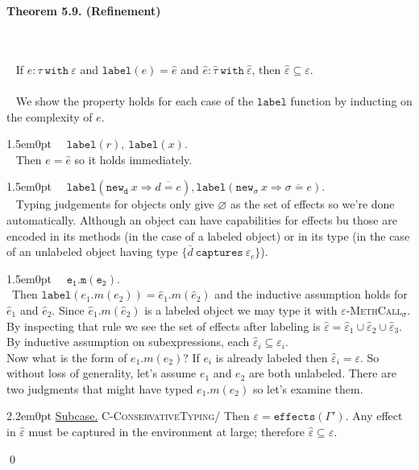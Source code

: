 \documentclass{llncs}
\newcommand{\keywadj}[1]{\mathtt{#1}}
\newcommand{\keyw}[1]{\keywadj{#1}~}
\newcommand{\thm}[3]{
	\begin{large}
		\bf{#1}
	\end{large} \\\\
	\fbox{Statement.} ~ #2
	\fbox{Proof.}~ #3 \qed
}
\newcommand{\proofcase}[2]{
	\begin{adjustwidth}{1.5em}{0pt}
		\fbox{Case.}~~#1. \\ ~#2
	\end{adjustwidth}
}
\newcommand{\subcase}[1] {
	\begin{adjustwidth}{2.2em}{0pt}
		\underline{Subcase.} #1
	\end{adjustwidth}
}
\begin{document}
\thm{Theorem 5.9. (Refinement)}
{If $e : \tau~\keyw{with} \varepsilon$ and $\keywadj{label}(e) = \hat e$ and $\hat e : \hat \tau~\keyw{with} \hat \varepsilon$, then $\hat \varepsilon \subseteq \varepsilon$.\\\\}
{We show the property holds for each case of the $\keywadj{label}$ function by inducting on the complexity of $e$.

\proofcase{$\keywadj{label}(r),~\keywadj{label}(x)$}{
	Then $e = \hat e$ so it holds immediately.
}
	
\proofcase{$\keywadj{label}(\keyw{new_d} x \Rightarrow \overline{d = e}), \keywadj{label}(\keyw{new_\sigma} x \Rightarrow \overline{\sigma = e})$}{
Typing judgements for objects only give $\varnothing$ as the set of effects so we're done automatically. Although an object can have capabilities for effects bu those are encoded in its methods (in the case of a labeled object) or in its type (in the case of an unlabeled object having type $\{ \bar d~\keyw{captures} \varepsilon_c\}$).
}	
	
\proofcase{$\keywadj{e_1.m(e_2)}$}{Then $\keywadj{label}(e_1.m(e_2)) = \hat e_1 . m(\hat e_2)$ and the inductive assumption holds for $\hat e_1$ and $\hat e_2$. Since $\hat e_1 . m(\hat e_2)$ is a labeled object we may type it with \textsc{$\varepsilon$-MethCall$_\sigma$}. By inspecting that rule we see the set of effects after labeling is $\hat \varepsilon = \hat \varepsilon_1 \cup \hat \varepsilon_2 \cup \hat \varepsilon_3$. By inductive assumption on subexpressions, each $\hat \varepsilon_i \subseteq \varepsilon_i$. \\

\noindent
Now what is the form of $e_1.m(e_2)$? If $e_i$ is already labeled then $\hat \varepsilon_i = \varepsilon$. So without loss of generality, let's assume $e_1$ and $e_2$ are both unlabeled. There are two judgments that might have typed $e_1.m(e_2)$ so let's examine them.



	\subcase{\textsc{C-ConservativeTyping/}
	Then $\varepsilon = \keywadj{effects}(\Gamma')$. Any effect in $\hat \varepsilon$ must be captured in the environment at large; therefore $\hat \varepsilon \subseteq \varepsilon$.
	}

}}
\end{document}
